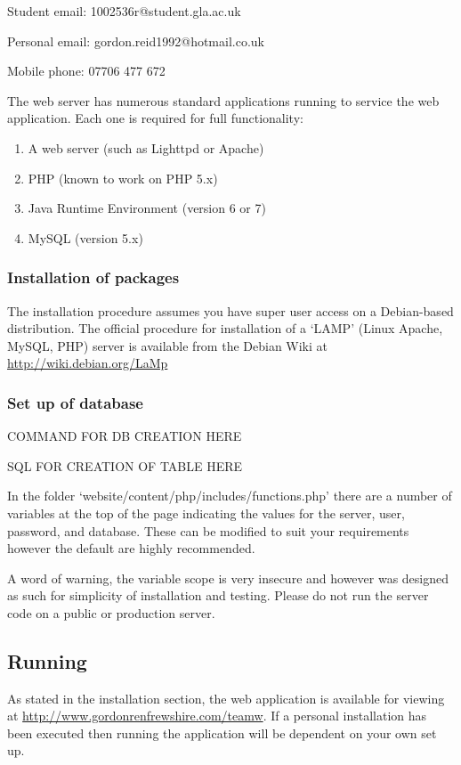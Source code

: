 Student email: 1002536r@student.gla.ac.uk

Personal email: gordon.reid1992@hotmail.co.uk

Mobile phone: 07706 477 672

The web server has numerous standard applications running to service the web
application. Each one is required for full functionality:

\begin{enumerate}
\item A web server (such as Lighttpd or Apache)
\item PHP (known to work on PHP 5.x)
\item Java Runtime Environment (version 6 or 7)
\item MySQL (version 5.x)
\end{enumerate}

\subsubsection{Installation of packages}

The installation procedure assumes you have super user access on a Debian-based
distribution. The official procedure for installation of a `LAMP' (Linux
Apache, MySQL, PHP) server is available from the Debian Wiki at
\url{http://wiki.debian.org/LaMp}

\subsubsection{Set up of database}

COMMAND FOR DB CREATION HERE

SQL FOR CREATION OF TABLE HERE

In the folder `website/content/php/includes/functions.php' there are a number
of variables at the top of the page indicating the values for the server, user,
password, and database. These can be modified to suit your requirements however
the default are highly recommended.

A word of warning, the variable scope is very insecure and however was designed
as such for simplicity of installation and testing. Please do not run the server
code on a public or production server.

\subsection{Running}

As stated in the installation section, the web application is available for
viewing at \url{http://www.gordonrenfrewshire.com/teamw}. If a personal
installation has been executed then running the application will be dependent
on your own set up.
